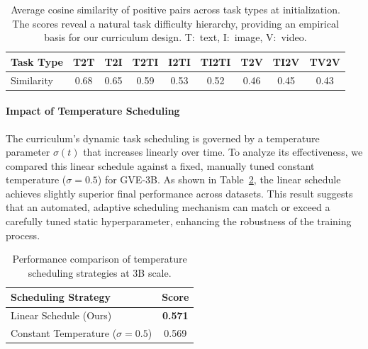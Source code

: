\begin{table}[t]
\centering
\caption{Average cosine similarity of positive pairs across task types at initialization. The scores reveal a natural task difficulty hierarchy, providing an empirical basis for our curriculum design. T:~text, I:~image, V:~video.}
\label{gve:tab:task_alignment_appendix}
\footnotesize
\begin{tabular}{lcccccccc}
\toprule
Task Type & T2T & T2I & T2TI & I2TI & TI2TI & T2V & TI2V & TV2V \\
\midrule
Similarity & 0.68 & 0.65 & 0.59 & 0.53 & 0.52 & 0.46 & 0.45 & 0.43 \\
\bottomrule
\end{tabular}
\end{table}


\paragraph{Impact of Temperature Scheduling}
The curriculum's dynamic task scheduling is governed by a temperature parameter $\sigma(t)$ that increases linearly over time. To analyze its effectiveness, we compared this linear schedule against a fixed, manually tuned constant temperature ($\sigma = 0.5$) for GVE-3B. As shown in Table~\ref{gve:tab:temp_schedule_appendix}, the linear schedule achieves slightly superior final performance across datasets. This result suggests that an automated, adaptive scheduling mechanism can match or exceed a carefully tuned static hyperparameter, enhancing the robustness of the training process.

\begin{table}[t]
\centering
\caption{Performance comparison of temperature scheduling strategies at 3B scale.}
\label{gve:tab:temp_schedule_appendix}
\begin{tabular}{lc}
\toprule
Scheduling Strategy & Score \\
\midrule
Linear Schedule (Ours) & \textbf{0.571} \\
Constant Temperature ($\sigma=0.5$) & 0.569 \\
\bottomrule
\end{tabular}
\end{table}

